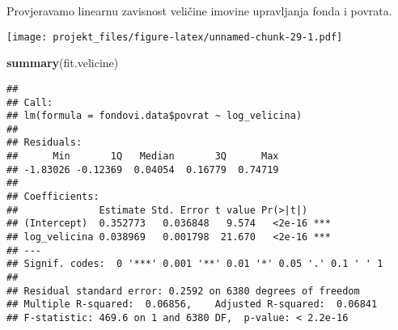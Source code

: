 \documentclass[
]{article}
\newenvironment{Shaded}{\begin{snugshade}}{\end{snugshade}}
\newcommand{\KeywordTok}[1]{\textcolor[rgb]{0.13,0.29,0.53}{\textbf{#1}}}
\newcommand{\NormalTok}[1]{#1}
\newcommand{\OperatorTok}[1]{\textcolor[rgb]{0.81,0.36,0.00}{\textbf{#1}}}
\newcommand{\StringTok}[1]{\textcolor[rgb]{0.31,0.60,0.02}{#1}}
\begin{document}
Provjeravamo linearnu zavisnost veličine imovine upravljanja fonda i
povrata.

\begin{Shaded}
\end{Shaded}

\texttt{[image: projekt\_files/figure-latex/unnamed-chunk-29-1.pdf]}

\begin{Shaded}
\begin{Highlighting}[]
\KeywordTok{summary}\NormalTok{(fit.velicine)}
\end{Highlighting}
\end{Shaded}

\begin{verbatim}
## 
## Call:
## lm(formula = fondovi.data$povrat ~ log_velicina)
## 
## Residuals:
##      Min       1Q   Median       3Q      Max 
## -1.83026 -0.12369  0.04054  0.16779  0.74719 
## 
## Coefficients:
##              Estimate Std. Error t value Pr(>|t|)    
## (Intercept)  0.352773   0.036848   9.574   <2e-16 ***
## log_velicina 0.038969   0.001798  21.670   <2e-16 ***
## ---
## Signif. codes:  0 '***' 0.001 '**' 0.01 '*' 0.05 '.' 0.1 ' ' 1
## 
## Residual standard error: 0.2592 on 6380 degrees of freedom
## Multiple R-squared:  0.06856,    Adjusted R-squared:  0.06841 
## F-statistic: 469.6 on 1 and 6380 DF,  p-value: < 2.2e-16
\end{verbatim}
\end{document}
